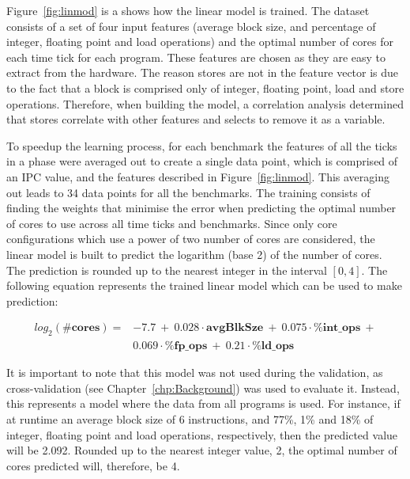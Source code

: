 Figure~\ref{fig:linmod} is a shows how the linear model is trained.
The dataset consists of a set of four input features (average block size, and percentage of integer, floating point and load operations) and the optimal number of cores for each time tick for each program.
These features are chosen as they are easy to extract from the hardware.
The reason stores are not in the feature vector is due to the fact that a block is comprised only of integer, floating point, load and store operations.
Therefore, when building the model, a correlation analysis determined that stores correlate with other features and selects to remove it as a variable.

To speedup the learning process, for each benchmark the features of all the ticks in a phase were averaged out to create a single data point, which is comprised of an IPC value, and the features described in Figure~\ref{fig:linmod}.
This averaging out leads to 34 data points for all the benchmarks.
The training consists of finding the weights that minimise the error when predicting the optimal number of cores to use across all time ticks and benchmarks.
Since only core configurations which use a power of two number of cores are considered, the linear model is built to predict the logarithm (base 2) of the number of cores.
The prediction is rounded up to the nearest integer in the interval $[0,4]$.
The following equation represents the trained linear model which can be used to make prediction:

\begin{align*}
  log_2(\textbf{\#cores}) = & -7.7\ +\ 0.028 \cdot \textbf{avgBlkSze}\ +\ 0.075 \cdot \textbf{\%int\_ops}\ +\\
 &0.069 \cdot \textbf{\%fp\_ops}\ +\ 0.21 \cdot \textbf{\%ld\_ops}
\end{align*}

It is important to note that this model was not used during the validation, as cross-validation (see Chapter~\ref{chp:Background}) was used to evaluate it.
Instead, this represents a model where the data from all programs is used.
For instance, if at runtime an average block size of 6 instructions, and 77\%, 1\% and 18\% of integer, floating point and load operations, respectively, then the predicted value will be 2.092.
Rounded up to the nearest integer value, 2, the optimal number of cores predicted will, therefore, be 4.


